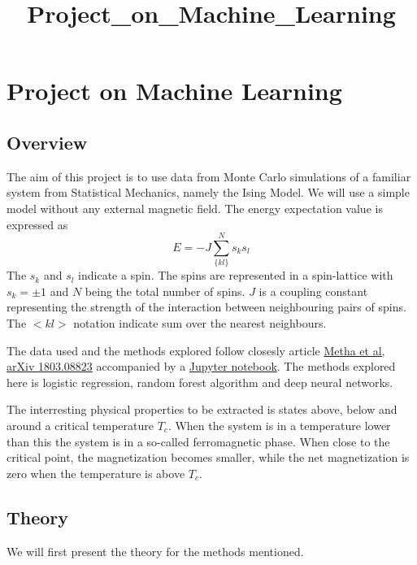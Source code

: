 \documentclass[10pt, t]{beamer}
\title{Project\_on\_Machine\_Learning}
\begin{document}
    
    
    \maketitle
    
    

    
    \hypertarget{project-on-machine-learning}{%
\section{Project on Machine
Learning}\label{project-on-machine-learning}}

\hypertarget{overview}{%
\subsection{Overview}\label{overview}}

The aim of this project is to use data from Monte Carlo simulations of a
familiar system from Statistical Mechanics, namely the Ising Model. We
will use a simple model without any external magnetic field. The energy
expectation value is expressed as \[E=-J\sum\limits^N_{\{kl\}}s_ks_l\]
The \(s_k\) and \(s_l\) indicate a spin. The spins are represented in a
spin-lattice with \(s_k=\pm 1\) and \(N\) being the total number of
spins. \(J\) is a coupling constant representing the strength of the
interaction between neighbouring pairs of spins. The \(<kl>\) notation
indicate sum over the nearest neighbours.

The data used and the methods explored follow closesly article
\href{https://arxiv.org/pdf/1803.08823.pdf}{Metha et al, arXiv
1803.08823} accompanied by a
\href{https://physics.bu.edu/~pankajm/MLnotebooks.html}{Jupyter
notebook}. The methods explored here is logistic regression, random
forest algorithm and deep neural networks.

The interresting physical properties to be extracted is states above,
below and around a critical temperature \(T_c\). When the system is in a
temperature lower than this the system is in a so-called ferromagnetic
phase. When close to the critical point, the magnetization becomes
smaller, while the net magnetization is zero when the temperature is
above \(T_c\).

\hypertarget{theory}{%
\subsection{Theory}\label{theory}}

We will first present the theory for the methods mentioned.
\end{document}
